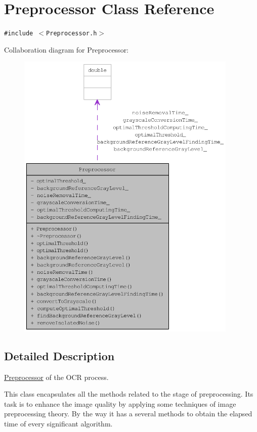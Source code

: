 \hypertarget{class_preprocessor}{
\section{Preprocessor Class Reference}
\label{class_preprocessor}
}
{\tt \#include $<$Preprocessor.h$>$}

Collaboration diagram for Preprocessor:\nopagebreak
\begin{figure}[H]
\begin{center}
\leavevmode
\includegraphics[height=400pt]{class_preprocessor__coll__graph}
\end{center}
\end{figure}


\subsection{Detailed Description}
\hyperlink{class_preprocessor}{Preprocessor} of the OCR process. 

This class encapsulates all the methods related to the stage of preprocessing. Its task is to enhance the image quality by applying some techniques of image preprocessing theory. By the way it has a several methods to obtain the elapsed time of every significant algorithm.

